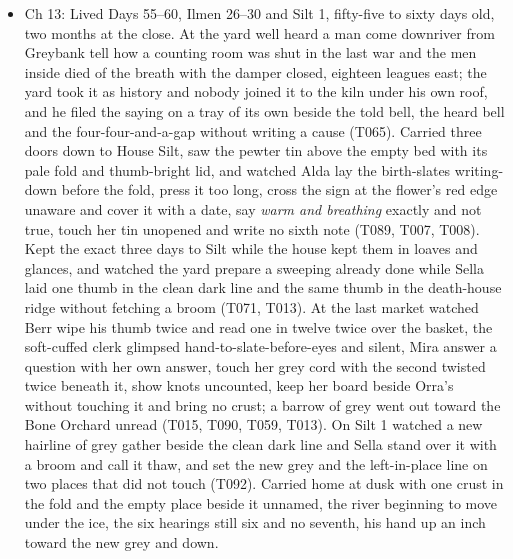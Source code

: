 \documentclass{design/chronicle}
\begin{document}
{\begin{itemize}[leftmargin=1.4em,itemsep=1pt,topsep=3pt,parsep=0pt]
\item Ch 13: Lived Days 55--60, Ilmen 26--30 and Silt 1, fifty-five to sixty days old, two months at the close. At the yard well heard a man come downriver from Greybank tell how a counting room was shut in the last war and the men inside died of the breath with the damper closed, eighteen leagues east; the yard took it as history and nobody joined it to the kiln under his own roof, and he filed the saying on a tray of its own beside the told bell, the heard bell and the four-four-and-a-gap without writing a cause (T065). Carried three doors down to House Silt, saw the pewter tin above the empty bed with its pale fold and thumb-bright lid, and watched Alda lay the birth-slates writing-down before the fold, press it too long, cross the sign at the flower’s red edge unaware and cover it with a date, say \emph{warm and breathing} exactly and not true, touch her tin unopened and write no sixth note (T089, T007, T008). Kept the exact three days to Silt while the house kept them in loaves and glances, and watched the yard prepare a sweeping already done while Sella laid one thumb in the clean dark line and the same thumb in the death-house ridge without fetching a broom (T071, T013). At the last market watched Berr wipe his thumb twice and read one in twelve twice over the basket, the soft-cuffed clerk glimpsed hand-to-slate-before-eyes and silent, Mira answer a question with her own answer, touch her grey cord with the second twisted twice beneath it, show knots uncounted, keep her board beside Orra’s without touching it and bring no crust; a barrow of grey went out toward the Bone Orchard unread (T015, T090, T059, T013). On Silt 1 watched a new hairline of grey gather beside the clean dark line and Sella stand over it with a broom and call it thaw, and set the new grey and the left-in-place line on two places that did not touch (T092). Carried home at dusk with one crust in the fold and the empty place beside it unnamed, the river beginning to move under the ice, the six hearings still six and no seventh, his hand up an inch toward the new grey and down.

\end{itemize}

\begin{itemize}[leftmargin=1.4em,itemsep=1pt,topsep=3pt,parsep=0pt]


\end{itemize}}
\end{document}
